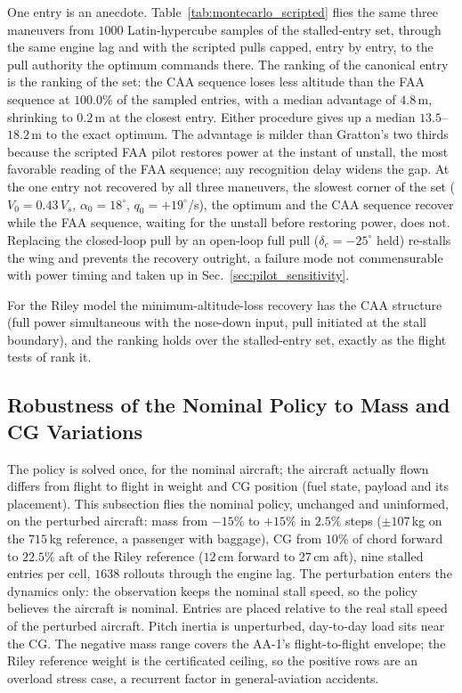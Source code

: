 \documentclass[journal ]{new-aiaa}
\begin{document}
One entry is an anecdote.
Table~\ref{tab:montecarlo_scripted} flies the same three maneuvers
from $1000$ Latin-hypercube samples of the stalled-entry set,
through the same engine lag and with the scripted pulls capped,
entry by entry, to the pull authority the optimum commands there.
The ranking of the canonical entry is the ranking of the set: the
CAA sequence loses less altitude than the FAA sequence at
$100.0\%$ of the sampled entries, with a median advantage of
$4.8$\,m, shrinking to $0.2$\,m at the closest entry. Either
procedure gives up a median $13.5$--$18.2$\,m to the exact
optimum. The advantage
is milder than Gratton's two thirds because the scripted FAA pilot
restores power at the instant of unstall, the most favorable
reading of the FAA sequence; any recognition delay widens
the gap. At the one entry not recovered by all three maneuvers, the
slowest corner of the set
($V_0 = 0.43\,V_s$, $\alpha_0 = 18^\circ$, $q_0 = +19^\circ$/s), the
optimum and the CAA sequence recover while the FAA sequence,
waiting for the unstall before restoring power, does not. Replacing
the closed-loop pull by an open-loop full pull
($\delta_e = -25^\circ$ held) re-stalls the wing and prevents the
recovery outright, a failure mode not commensurable with power
timing and taken up in Sec.~\ref{sec:pilot_sensitivity}.



For the Riley model the minimum-altitude-loss recovery has the CAA
structure (full power simultaneous with the nose-down input, pull
initiated at the stall boundary), and the ranking holds over the
stalled-entry set, exactly as the flight tests of
\cite{Gratton2014} rank it.


\FloatBarrier
\subsection{Robustness of the Nominal Policy to Mass and CG Variations}
\label{sec:robustness}

The policy is solved once, for the nominal aircraft; the aircraft
actually flown differs from flight to flight in weight and CG
position (fuel state, payload and its placement). This subsection
flies the nominal policy, unchanged and uninformed, on the
perturbed aircraft: mass from $-15\%$ to $+15\%$ in $2.5\%$ steps
($\pm 107$\,kg on the $715$\,kg reference, a passenger with
baggage), CG from $10\%$ of chord forward to $22.5\%$ aft of the
Riley reference ($12$\,cm forward to $27$\,cm aft), nine stalled
entries per cell, $1638$ rollouts through the engine lag. The perturbation enters the dynamics only: the
observation keeps the nominal stall speed, so the policy believes
the aircraft is nominal. Entries are placed relative to the real
stall speed of the perturbed aircraft. Pitch inertia is
unperturbed, day-to-day load sits near the CG. The negative mass
range covers the AA-1's flight-to-flight envelope; the Riley
reference weight is the certificated ceiling, so the positive rows
are an overload stress case, a recurrent factor in
general-aviation accidents.
\end{document}
